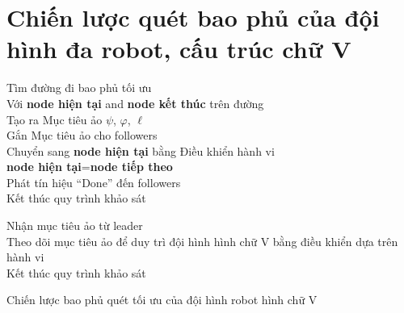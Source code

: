\section{Chiến lược quét bao phủ của đội hình đa robot, cấu trúc chữ V}
\begin{algorithm}
{
    {
        {
            Tìm đường đi bao phủ tối ưu\\
        }
        \Else
        {
            Với \textbf{node hiện tại} and \textbf{node kết thúc} trên đường\\
            {
             Tạo ra Mục tiêu ảo $\psi$, $\varphi$, $\ell$\\
             Gắn Mục tiêu ảo cho followers \\
             Chuyển sang \textbf{node hiện tại} bằng Điều khiển hành vi\\
             \textbf{node hiện tại}=\textbf{node tiếp theo}\\
            }
            \Else
            {
                Phát tín hiệu ``Done'' đến followers\\
                Kết thúc quy trình khảo sát \\
            }
        }
    }
    
    {
        Nhận mục tiêu ảo từ leader\\
        Theo dõi mục tiêu ảo để duy trì đội hình hình chữ V bằng điều khiển dựa trên hành vi\\ 
        {
             Kết thúc quy trình khảo sát\\
        }
    }
}
\caption{Chiến lược bao phủ quét tối ưu của đội hình robot hình chữ V}
\label{alg:Covestrategy} 
\end{algorithm}

